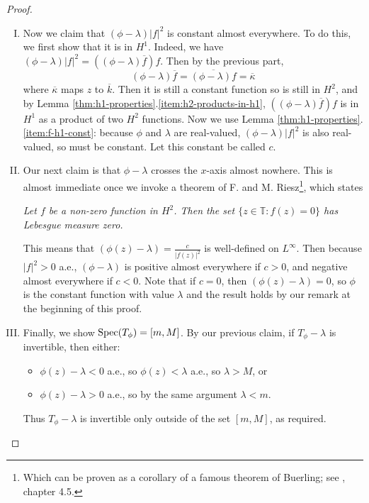 \documentclass[../main.tex]{subfiles}
\begin{document}
\begin{proof}
\begin{enumerate}[I.]
\item Now we claim that $(\phi - \lambda)|f|^2$ is constant almost everywhere. To do this, we first show that it is in $H^1$. Indeed, we have
$(\phi - \lambda)|f|^2 = ((\phi - \lambda)\overline{f}) f$. Then by the previous part, $$(\phi - \lambda)\overline{f} = \overline{(\phi - \lambda)f} = \overline{\kappa}$$
where $\overline{\kappa}$ maps $z$ to $\overline{k}$. Then it is still a constant function so is still in $H^2$, and by Lemma \ref{thm:h1-properties}.\ref{item:h2-products-in-h1}, $((\phi - \lambda)\overline{f}) f$ is in $H^1$ as a product of two $H^2$ functions. Now we use Lemma \ref{thm:h1-properties}.\ref{item:f-h1-const}: because $\phi$ and $\lambda$ are real-valued, $(\phi - \lambda)|f|^2$ is also real-valued, so must be constant. Let this constant be called $c$.
\item Our next claim is that $\phi - \lambda$ crosses the $x$-axis almost nowhere. This is almost immediate once we invoke a theorem of F. and M. Riesz\footnote{Which can be proven as a corollary of a famous theorem of Buerling; see \parencite{arveson2002short}, chapter 4.5.}, which states
\begin{displayquote}
\emph{Let $f$ be a non-zero function in $H^2$. Then the set $\{z \in \mathbb{T} : f(z) = 0\}$ has Lebesgue measure zero.}
\end{displayquote}
This means that $(\phi(z) - \lambda) = \frac{c}{|f(z)|^2}$ is well-defined on $L^\infty$. Then because $|f|^2 > 0$ a.e., $(\phi - \lambda)$ is positive almost everywhere if $c > 0$, and negative almost everywhere if $c < 0$. Note that if $c = 0$, then $(\phi(z) - \lambda) = 0$, so $\phi$ is the 
constant function with value $\lambda$ and the result holds by our remark at the beginning of this proof.
\item Finally, we show $\mathrm{Spec}(T_\phi) = [m, M]$. By our previous claim, if $T_\phi - \lambda$ is invertible, then either:
\begin{itemize}
\item $\phi(z) - \lambda < 0$ a.e., so $\phi(z) < \lambda$ a.e., so $\lambda > M$, or
\item $\phi(z) - \lambda > 0$ a.e., so by the same argument $\lambda < m$.
\end{itemize}
Thus $T_\phi - \lambda$ is invertible only outside of the set $[m, M]$, as required.
\end{enumerate}
\end{proof}
\end{document}
